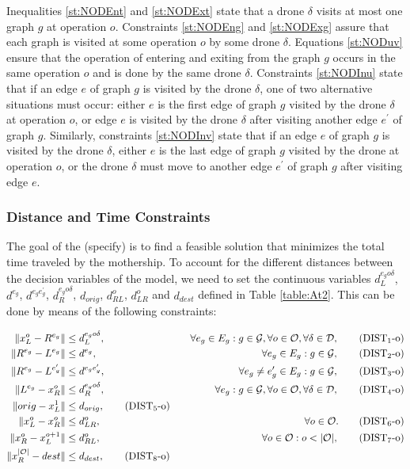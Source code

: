 \noindent 
 Inequalities \eqref{st:NODEnt} and \eqref{st:NODExt} state that a drone $\delta$ visits at most one graph $g$ at operation $o$.  Constraints \eqref{st:NODEng} and \eqref{st:NODExg} assure that each graph is visited at some operation $o$ by some drone $\delta$. Equations \eqref{st:NODuv} ensure that the operation of entering and exiting from the graph $g$ occurs in the same operation $o$ and is done by the same drone $\delta$. Constraints \eqref{st:NODInu} state that if an edge $e$ of graph $g$ is visited by the drone $\delta$, one of two alternative situations must occur: either $e$ is the first edge of graph $g$ visited by the drone $\delta$ at operation $o$, or edge $e$ is visited by the drone $\delta$ after visiting another edge $e^\prime$ of graph $g$. Similarly, constraints \eqref{st:NODInv} state that if an edge $e$ of graph $g$ is visited by the drone $\delta$, either $e$ is the last edge of graph $g$ visited by the drone at operation $o$, or the drone $\delta$ must move to another edge $e^\prime$ of graph $g$ after visiting edge $e$.

\subsubsection*{Distance and Time Constraints}
\noindent
 The goal of the \AMD\xspace (specify) is to find a feasible solution that minimizes the total time traveled by the mothership. To account for the different distances between the decision variables of the model, we need to set the continuous variables $d_L^{e_go\delta}$, $d^{e_g}$, $d^{e_ge^\prime_g}$, $d_R^{e_go\delta}$, $d_{orig}$, $d_{RL}^o$, $d_{LR}^o$ and $d_{dest}$ defined in Table \ref{table:At2}. This can be done by means of the following constraints:
 

\begin{align*}
\|x_L^o- R^{e_g}\| & \leq  d_L^{e_go\delta},  &\quad \forall e_g\in E_g:g\in \mathcal{G}, \forall o\in \mathcal O, \forall \delta\in\mathcal D, \tag{DIST$_{1}$-o} \label{eq:NOd1}\\
\|R^{e_g}- L^{e_g}\| & \leq  d^{e_g},  &\quad \forall e_g\in E_g:g\in \mathcal{G}, \tag{DIST$_{2}$-o} \label{eq:NOd2}\\
\|R^{e_g}- L^{e^\prime_g}\| & \leq  d^{e_ge^\prime_g}, &\quad \forall e_g\neq e_g'\in E_g:g\in \mathcal{G}, \tag{DIST$_{3}$-o} \label{eq:NOd3}\\
\|L^{e_g}- x_R^o\| & \leq  d_R^{e_go\delta}, &\quad \forall e_g:g\in \mathcal{G},\forall o\in \mathcal O, \forall \delta\in\mathcal D, \tag{DIST$_{4}$-o} \label{eq:NOd4}\\
\|orig - x_L^1\| & \leq d_{orig}, \tag{DIST$_5$-o}\label{eq:NOd5}\\
\|x_L^o- x_R^o\| & \leq  d_{LR}^o, & \quad \forall o\in \mathcal O. \tag{DIST$_{6}$-o} \label{eq:NOd6}\\
\|x_R^o- x_L^{o+1}\| & \leq  d_{RL}^o, & \quad \forall o\in \mathcal O:o<|\mathcal O|, \tag{DIST$_{7}$-o} \label{eq:NOd7}\\
\|x_R^{|\mathcal O|} - dest\| & \leq d_{dest}, \tag{DIST$_8$-o}\label{eq:NOd8}\\
\end{align*}

